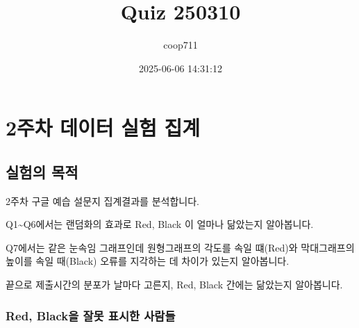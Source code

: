 \documentclass[
]{article}
\title{Quiz 250310}
\author{coop711}
\date{2025-06-06 14:31:12}
\begin{document}
\maketitle

\section{2주차 데이터 실험
집계}\label{uxc8fcuxcc28-uxb370uxc774uxd130-uxc2e4uxd5d8-uxc9d1uxacc4}

\subsection{실험의 목적}\label{uxc2e4uxd5d8uxc758-uxbaa9uxc801}

2주차 구글 예습 설문지 집계결과를 분석합니다.

Q1\textasciitilde Q6에서는 랜덤화의 효과로 Red, Black 이 얼마나 닮았는지
알아봅니다.

Q7에서는 같은 눈속임 그래프인데 원형그래프의 각도를 속일 떄(Red)와
막대그래프의 높이를 속일 때(Black) 오류를 지각하는 데 차이가 있는지
알아봅니다.

끝으로 제출시간의 분포가 날마다 고른지, Red, Black 간에는 닮았는지
알아봅니다.

\subsubsection{Red, Black을 잘못 표시한
사람들}\label{red-blackuxc744-uxc798uxbabb-uxd45cuxc2dcuxd55c-uxc0acuxb78cuxb4e4}
\end{document}
